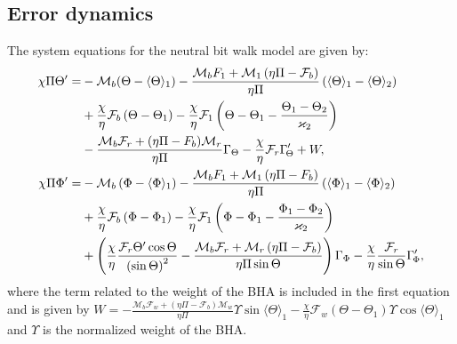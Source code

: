 \documentclass[../main.tex]{subfiles}
\begin{document}
	
	\subsection{Error dynamics}
	The system equations for the neutral bit walk model are given by:
	\begin{equation}
	\begin{aligned}
	\chi \Pi \Theta ' =  &- \mathcal{M}_b(\Theta-\langle\Theta \rangle_1)-\frac{{{\mathcal{M}_b}{F_1} + {\mathcal{M}_1}\left( {\eta \Pi  - {\mathcal{F}_b}} \right)}}{{\eta \Pi }}\left( {{\langle{\rm{\Theta }} \rangle_1} - {\langle{\rm{\Theta }} \rangle_{2}}} \right)
	\\
	&+\frac{\chi }{\eta }{\mathcal{F}_b}\left( {{\rm{\Theta }} - {{\rm{\Theta }}_1}} \right)
	- \frac{\chi }{\eta }{\mathcal{F}_1}\left( {{{{{\rm{\Theta }}} - {{\rm{\Theta }}_1}}} - \frac{{{{\rm{\Theta }}_1} - {{\rm{\Theta }}_{2}}}}{{{\varkappa _{2}}}}} \right)
	\\
	&- \frac{{{\mathcal{M}_b}{\mathcal{F}_r} + (\eta \Pi  - {F_b}){\mathcal{M}_r}}}{{\eta \Pi }}{\Gamma _{\Theta}} - \frac{\chi }{\eta }{\mathcal{F}_r}\Gamma_{\!\Theta}' + W,
	\\
	\chi \Pi \Phi ' =  &- {\mathcal{M}_b}\left( {\Phi  - {\langle{\rm{\Phi }} \rangle_1}} \right)-\frac{{{\mathcal{M}_b}{F_1} + {\mathcal{M}_1}\left( {\eta \Pi  - {F_b}} \right)}}{{\eta \Pi }}\left( {{\langle{\rm{\Phi }} \rangle_1} - {\langle{\rm{\Phi }} \rangle_{2}}} \right)
	\\
	&+\frac{\chi }{\eta }{\mathcal{F}_b}\left( {{\rm{\Phi }} - {{\rm{\Phi }}_1}} \right)
	- \frac{\chi }{\eta }{\mathcal{F}_1}\left( {{{{{\rm{\Phi }}} - {{\rm{\Phi }}_1}}} - \frac{{{{\rm{\Phi }}_1} - {{\rm{\Phi }}_{2}}}}{{{\varkappa _{2}}}}} \right)
	\\
	&+ \left( {\frac{\chi }{\eta }\frac{{{\mathcal{F}_r}\Theta '\cos \Theta }}{{{{\left( {\sin \Theta } \right)}^2}}} - \frac{{{\mathcal{M}_b}{\mathcal{F}_r} + {\mathcal{M}_r}\left( {\eta \Pi  - {\mathcal{F}_b}} \right)}}{{\eta \Pi \sin \Theta }}} \right){\Gamma _{\Phi}} - \frac{\chi }{\eta }\frac{{{\mathcal{F}_r}}}{{\sin \Theta }}\Gamma_{\!\Phi}',
	\end{aligned}
	\label{eq:neutralbitwalkmodelfordesign}
	\end{equation}
	where the term related to the weight of the BHA is included in the first equation and is given by $W = -\frac{\mathcal{M}_b \mathcal{F}_w + (\eta \Pi - \mathcal{F}_b)\mathcal{M}_w}{\eta \Pi}\Upsilon \sin \langle\Theta\rangle_1 -\frac{\chi}{\eta}\mathcal{F}_w (\Theta - \Theta_1)\Upsilon \cos \langle\Theta\rangle_1$ and $\Upsilon$ is the normalized weight of the BHA.	
	
\end{document}
